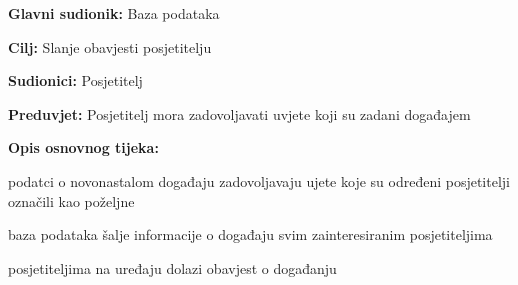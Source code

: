 					\noindent {}
					\begin{packed_item}
	
						\item \textbf{Glavni sudionik: }Baza podataka 
						\item  \textbf{Cilj:} Slanje obavjesti posjetitelju 
						\item  \textbf{Sudionici:} Posjetitelj
						\item  \textbf{Preduvjet:} Posjetitelj mora zadovoljavati uvjete koji su zadani događajem
						\item  \textbf{Opis osnovnog tijeka:}
						
						\item[] \begin{packed_enum}
	
							\item podatci o novonastalom događaju zadovoljavaju ujete koje su određeni posjetitelji označili kao poželjne
							\item baza podataka šalje informacije o događaju svim zainteresiranim posjetiteljima
							\item posjetiteljima na uređaju dolazi obavjest o događanju
						\end{packed_enum}
						
					\end{packed_item}
					

